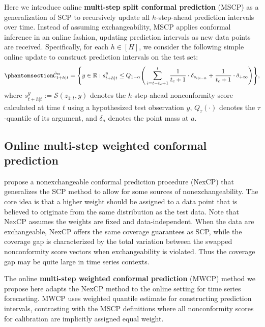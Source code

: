 \documentclass[
  11pt,
  a4paper,
]{article}
\theoremstyle{plain}
\theoremstyle{remark}
\begin{document}
Here we introduce online \textbf{multi-step split conformal prediction}
(MSCP) as a generalization of SCP to recursively update all
\(h\)-step-ahead prediction intervals over time. Instead of assuming
exchangeability, MSCP applies conformal inference in an online fashion,
updating prediction intervals as new data points are received.
Specifically, for each \(h \in [H]\), we consider the following simple
online update to construct prediction intervals on the test set:
\begin{equation}\phantomsection\label{eq-mscp}{
\hat{\mathcal{C}}_{t+h|t}^{\alpha} = \Bigg\{y\in\mathbb{R}: s_{t+h|t}^{y} \leq Q_{1-\alpha}\Bigg(\sum_{i=t-t_c+1}^{t}\frac{1}{t_c+1}\cdot\delta_{s_{i|i-h}}+\frac{1}{t_c+1}\cdot\delta_{+\infty}\Bigg)\Bigg\},
}\end{equation} where \(s_{t+h|t}^{y}:=\mathcal{S}(z_{1:t}, y)\) denotes
the \(h\)-step-ahead nonconformity score calculated at time \(t\) using
a hypothesized test observation \(y\), \(Q_\tau(\cdot)\) denotes the
\(\tau\)-quantile of its argument, and \(\delta_a\) denotes the point
mass at \(a\).

\subsection{Online multi-step weighted conformal
prediction}\label{online-multi-step-weighted-conformal-prediction}

\textcite{barber2023} propose a nonexchangeable conformal prediction
procedure (NexCP) that generalizes the SCP method to allow for some
sources of nonexchangeability. The core idea is that a higher weight
should be assigned to a data point that is believed to originate from
the same distribution as the test data. Note that NexCP assumes the
weights are fixed and data-independent. When the data are exchangeable,
NexCP offers the same coverage guarantees as SCP, while the coverage gap
is characterized by the total variation between the swapped
nonconformity score vectors when exchangeability is violated. Thus the
coverage gap may be quite large in time series contexts.

The online \textbf{multi-step weighted conformal prediction} (MWCP)
method we propose here adapts the NexCP method to the online setting for
time series forecasting. MWCP uses weighted quantile estimate for
constructing prediction intervals, contrasting with the MSCP definitions
where all nonconformity scores for calibration are implicitly assigned
equal weight.
\end{document}
